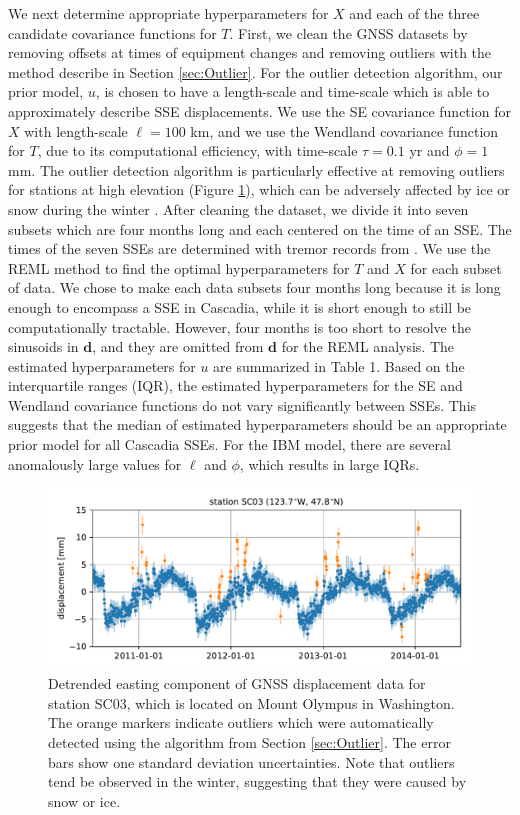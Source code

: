 \documentclass[10pt,letter]{article}
\begin{document}
We next determine appropriate hyperparameters for $X$ and each of the three candidate covariance functions for $T$. First, we clean the GNSS datasets by removing offsets at times of equipment changes and removing outliers with the method describe in Section \ref{sec:Outlier}. For the outlier detection algorithm, our prior model, $u$, is chosen to have a length-scale and time-scale which is able to approximately describe SSE displacements. We use the SE covariance function for $X$ with length-scale $\ell = 100$ km, and we use the Wendland covariance function for $T$, due to its computational efficiency, with time-scale $\tau = 0.1$ yr and $\phi = 1$ mm.  The outlier detection algorithm is particularly effective at removing outliers for stations at high elevation (Figure \ref{fig:Outliers}), which can be adversely affected by ice or snow during the winter \citep{Lisowski2008}. After cleaning the dataset, we divide it into seven subsets which are four months long and each centered on the time of an SSE. The times of the seven SSEs are determined with tremor records from \cite{Wech2010}. We use the REML method to find the optimal hyperparameters for $T$ and $X$ for each subset of data. We chose to make each data subsets four months long because it is long enough to encompass a SSE in Cascadia, while it is short enough to still be computationally tractable. However, four months is too short to resolve the sinusoids in $\bm{d}$, and they are omitted from $\bm{d}$ for the REML analysis. The estimated hyperparameters for $u$ are summarized in Table 1. Based on the interquartile ranges (IQR), the estimated hyperparameters for the SE and Wendland covariance functions do not vary significantly between SSEs. This suggests that the median of estimated hyperparameters should be an appropriate prior model for all Cascadia SSEs. For the IBM model, there are several anomalously large values for $\ell$ and $\phi$, which results in large IQRs.   

\begin{figure}
\includegraphics{figures/outliers/outliers.pdf}
\caption{Detrended easting component of GNSS displacement data for station SC03, which is located on Mount Olympus in Washington. The orange markers indicate outliers which were automatically detected using the algorithm from Section \ref{sec:Outlier}. The error bars show one standard deviation uncertainties. Note that outliers tend be observed in the winter, suggesting that they were caused by snow or ice.}   
\label{fig:Outliers}
\end{figure}
\end{document}
